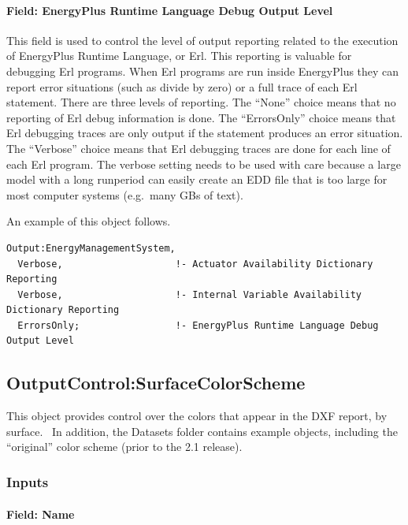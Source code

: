 \paragraph{Field: EnergyPlus Runtime Language Debug Output Level}\label{field-energyplus-runtime-language-debug-output-level}

This field is used to control the level of output reporting related to the execution of EnergyPlus Runtime Language, or Erl. This reporting is valuable for debugging Erl programs. When Erl programs are run inside EnergyPlus they can report error situations (such as divide by zero) or a full trace of each Erl statement. There are three levels of reporting. The ``None'' choice means that no reporting of Erl debug information is done. The ``ErrorsOnly'' choice means that Erl debugging traces are only output if the statement produces an error situation. The ``Verbose'' choice means that Erl debugging traces are done for each line of each Erl program. The verbose setting needs to be used with care because a large model with a long runperiod can easily create an EDD file that is too large for most computer systems (e.g.~many GBs of text).

An example of this object follows.

\begin{lstlisting}
Output:EnergyManagementSystem,
  Verbose,                    !- Actuator Availability Dictionary Reporting
  Verbose,                    !- Internal Variable Availability Dictionary Reporting
  ErrorsOnly;                 !- EnergyPlus Runtime Language Debug Output Level
\end{lstlisting}

\subsection{OutputControl:SurfaceColorScheme}\label{outputcontrolsurfacecolorscheme}

This object provides control over the colors that appear in the DXF report, by surface.~ In addition, the Datasets folder contains example objects, including the ``original'' color scheme (prior to the 2.1 release).

\subsubsection{Inputs}\label{inputs-6-021}

\paragraph{Field: Name}\label{field-name-039}

